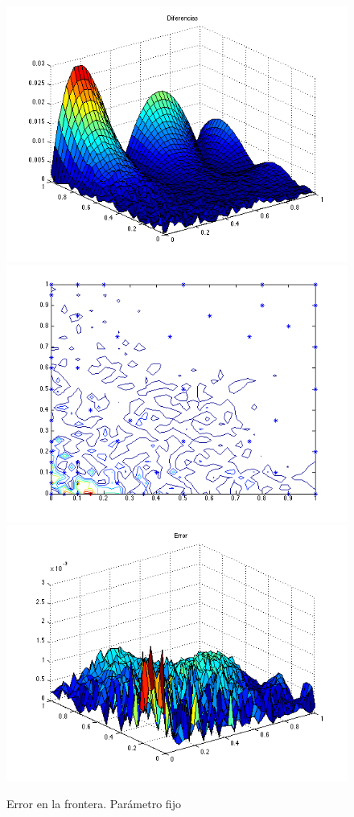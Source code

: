 \documentclass[11pt,a4paper]{article}
\begin{document}
\begin{figure}

\includegraphics[scale=.27]{diferencias3_3.png}
\includegraphics[scale=.27]{centros3_3.png}
\includegraphics[scale=.27]{error3_3.png}
\caption{Error en la frontera. Parámetro fijo}
\end{figure}
\end{document}
